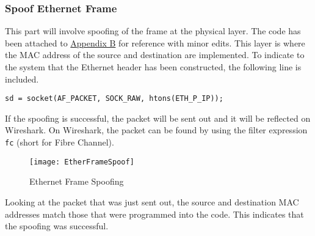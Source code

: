 \documentclass[a4paper,12pt]{article}
\begin{document}
\subsubsection{Spoof Ethernet Frame}
This part will involve spoofing of the frame at the physical layer. The code has been attached to \hyperref[ch:EthSpoof]{Appendix B} for reference with minor edits. This layer is where the MAC address of the source and destination are implemented. To indicate to the system that the Ethernet header has been constructed, the following line is included.
\begin{verbatim}
sd = socket(AF_PACKET, SOCK_RAW, htons(ETH_P_IP));
\end{verbatim}
If the spoofing is successful, the packet will be sent out and it will be reflected on Wireshark. On Wireshark, the packet can be found by using the filter expression \texttt{fc} (short for Fibre Channel).

\begin{figure}[H]
\centering
\texttt{[image: EtherFrameSpoof]}
\caption{Ethernet Frame Spoofing}
\label{fig:etherframespoof}
\end{figure}

\noindent Looking at the packet that was just sent out, the source and destination MAC addresses match those that were programmed into the code. This indicates that the spoofing was successful.
\end{document}
